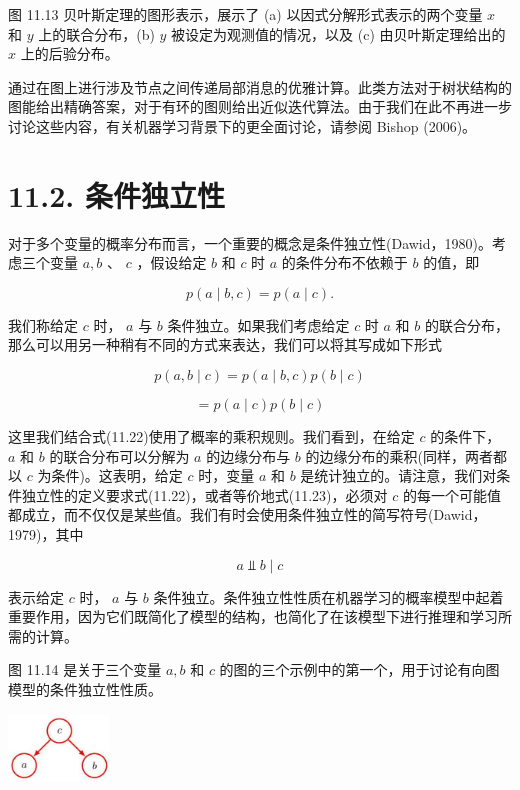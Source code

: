 \documentclass[10pt]{report}
\begin{document}
图 11.13 贝叶斯定理的图形表示，展示了 (a) 以因式分解形式表示的两个变量 \(x\) 和 \(y\) 上的联合分布，(b) \(y\) 被设定为观测值的情况，以及 (c) 由贝叶斯定理给出的 \(x\) 上的后验分布。

通过在图上进行涉及节点之间传递局部消息的优雅计算。此类方法对于树状结构的图能给出精确答案，对于有环的图则给出近似迭代算法。由于我们在此不再进一步讨论这些内容，有关机器学习背景下的更全面讨论，请参阅 Bishop (2006)。

\section*{11.2. 条件独立性}

对于多个变量的概率分布而言，一个重要的概念是条件独立性(Dawid，1980)。考虑三个变量 \(a,b\) 、 \(c\) ，假设给定 \(b\) 和 \(c\) 时 \(a\) 的条件分布不依赖于 \(b\) 的值，即

\[
p\left( {a \mid  b,c}\right)  = p\left( {a \mid  c}\right) . \tag{11.22}
\]

我们称给定 \(c\) 时， \(a\) 与 \(b\) 条件独立。如果我们考虑给定 \(c\) 时 \(a\) 和 \(b\) 的联合分布，那么可以用另一种稍有不同的方式来表达，我们可以将其写成如下形式

\[
p\left( {a,b \mid  c}\right)  = p\left( {a \mid  b,c}\right) p\left( {b \mid  c}\right)
\]

\[
= p\left( {a \mid  c}\right) p\left( {b \mid  c}\right)  \tag{11.23}
\]

这里我们结合式(11.22)使用了概率的乘积规则。我们看到，在给定 \(c\) 的条件下， \(a\) 和 \(b\) 的联合分布可以分解为 \(a\) 的边缘分布与 \(b\) 的边缘分布的乘积(同样，两者都以 \(c\) 为条件)。这表明，给定 \(c\) 时，变量 \(a\) 和 \(b\) 是统计独立的。请注意，我们对条件独立性的定义要求式(11.22)，或者等价地式(11.23)，必须对 \(c\) 的每一个可能值都成立，而不仅仅是某些值。我们有时会使用条件独立性的简写符号(Dawid，1979)，其中

\[
a ⫫ b \mid  c \tag{11.24}
\]

表示给定 \(c\) 时， \(a\) 与 \(b\) 条件独立。条件独立性性质在机器学习的概率模型中起着重要作用，因为它们既简化了模型的结构，也简化了在该模型下进行推理和学习所需的计算。

图 11.14 是关于三个变量 \(a,b\) 和 \(c\) 的图的三个示例中的第一个，用于讨论有向图模型的条件独立性性质。

\begin{center}
\includegraphics[max width=0.2\textwidth]{images/0194e279-9b28-703a-88f4-c3ac21e2010d_357_1287_346_264_180_0.jpg}
\end{center}
\hspace*{3em} 
\end{document}
